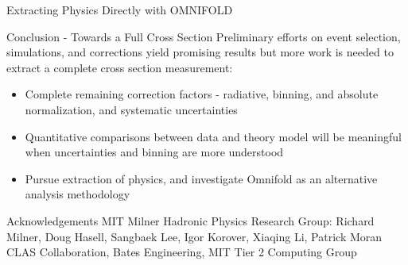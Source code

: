 \documentclass[aspectratio=169]{beamer}
\newcommand*{\myfont}{\fontfamily{lmtt}\selectfont}
\begin{document}
\begin{frame}{Extracting Physics Directly with OMNIFOLD}
                        {\myfont{\tiny    [ arxiv:1911.09107]   }}
                       

\end{frame}


\begin{frame}{Conclusion - Towards a Full Cross Section}
Preliminary efforts on event selection, simulations, and corrections yield promising results but more work is needed to extract a complete cross section measurement:
\vspace{0.4cm}
\begin{itemize}
    \setlength\itemsep{1em}
    \item Complete remaining correction factors - radiative, binning, and absolute normalization, and systematic uncertainties
    \item Quantitative comparisons between data and theory model will be meaningful when uncertainties and binning are more understood
    \item Pursue extraction of physics, and investigate Omnifold as an alternative analysis methodology
\end{itemize}
    
\end{frame}
\begin{frame}{Acknowledgements}
MIT Milner Hadronic Physics Research Group: Richard Milner, Doug Hasell, Sangbaek Lee, Igor Korover, Xiaqing Li, Patrick Moran\\
CLAS Collaboration, Bates Engineering, MIT Tier 2 Computing Group
    
\end{frame}
\end{document}
